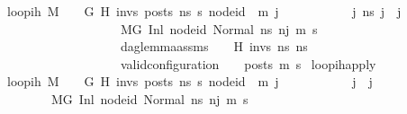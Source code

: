 \begin{isabellebody}
\ \ \ {\isachardoublequoteopen}loop{\isacharunderscore}{\kern0pt}ih\ M\ {\isasymLambda}\ {\isasymGamma}\ {\isasymOmega}\ G\ H\ invs\ posts\ ns{}\ s{\isacharprime}{\kern0pt}\ node{\isacharunderscore}{\kern0pt}id\ \ m{\isacharprime}{\kern0pt}\ j{\isasymequiv}\ \isanewline
\ \ \ \ \ \ \ \ \ \ {\isasymforall}j{\isacharprime}{\kern0pt}\ ns{}{\isacharprime}{\kern0pt}{\isacharprime}{\kern0pt}{\isachardot}{\kern0pt}\ j{\isacharprime}{\kern0pt}\ {\isasymle}\ j\ {\isasymlongrightarrow}\ \isanewline
\ \ \ \ \ \ \ \ \ \ \ \ \ \ \ \ \ \ \ \ \ {\isacharparenleft}{\kern0pt}M{\isacharcomma}{\kern0pt}{\isasymLambda}{\isacharcomma}{\kern0pt}{\isasymGamma}{\isacharcomma}{\kern0pt}{\isasymOmega}{\isacharcomma}{\kern0pt}G\ {\isasymturnstile}{\isacharparenleft}{\kern0pt}Inl\ node{\isacharunderscore}{\kern0pt}id{\isacharcomma}{\kern0pt}\ Normal\ ns{}{\isacharprime}{\kern0pt}{\isacharprime}{\kern0pt}{\isacharparenright}{\kern0pt}\ {\isacharminus}{\kern0pt}n{\isasymrightarrow}{\isacharcircum}{\kern0pt}j{\isacharprime}{\kern0pt}\ {\isacharparenleft}{\kern0pt}m{\isacharprime}{\kern0pt}{\isacharcomma}{\kern0pt}\ s{\isacharprime}{\kern0pt}{\isacharparenright}{\kern0pt}{\isacharparenright}{\kern0pt}\ {\isasymlongrightarrow}\isanewline
\ \ \ \ \ \ \ \ \ \ \ \ \ \ \ \ \ \ \ \ \ dag{\isacharunderscore}{\kern0pt}lemma{\isacharunderscore}{\kern0pt}assms\ {\isasymLambda}\ {\isasymGamma}\ {\isasymOmega}\ H\ invs\ ns{}{\isacharprime}{\kern0pt}{\isacharprime}{\kern0pt}\ ns{}\ {\isasymlongrightarrow}\ \isanewline
\ \ \ \ \ \ \ \ \ \ \ \ \ \ \ \ \ \ \ \ \ valid{\isacharunderscore}{\kern0pt}configuration\ {\isasymLambda}\ {\isasymGamma}\ {\isasymOmega}\ posts\ m{\isacharprime}{\kern0pt}\ s{\isacharprime}{\kern0pt}{\isachardoublequoteclose}\isanewline
\isanewline
{}\isamarkupfalse%
\ loop{\isacharunderscore}{\kern0pt}ih{\isacharunderscore}{\kern0pt}apply{\isacharcolon}{\kern0pt}\isanewline
\ \ \ {\isachardoublequoteopen}loop{\isacharunderscore}{\kern0pt}ih\ M\ {\isasymLambda}\ {\isasymGamma}\ {\isasymOmega}\ G\ H\ invs\ posts\ ns{}\ s{\isacharprime}{\kern0pt}\ node{\isacharunderscore}{\kern0pt}id\ \ m{\isacharprime}{\kern0pt}\ j{\isachardoublequoteclose}\ \isanewline
\ \ \ \ \ \ \ \ \ \ {\isachardoublequoteopen}j{\isacharprime}{\kern0pt}\ {\isasymle}\ j{\isachardoublequoteclose}\ \isanewline
\ \ \ \ \ \ \ \ \ \ {\isachardoublequoteopen}{\isacharparenleft}{\kern0pt}M{\isacharcomma}{\kern0pt}{\isasymLambda}{\isacharcomma}{\kern0pt}{\isasymGamma}{\isacharcomma}{\kern0pt}{\isasymOmega}{\isacharcomma}{\kern0pt}G\ {\isasymturnstile}{\isacharparenleft}{\kern0pt}Inl\ node{\isacharunderscore}{\kern0pt}id{\isacharcomma}{\kern0pt}\ Normal\ ns{}{\isacharprime}{\kern0pt}{\isacharprime}{\kern0pt}{\isacharparenright}{\kern0pt}\ {\isacharminus}{\kern0pt}n{\isasymrightarrow}{\isacharcircum}{\kern0pt}j{\isacharprime}{\kern0pt}\ {\isacharparenleft}{\kern0pt}m{\isacharprime}{\kern0pt}{\isacharcomma}{\kern0pt}\ s{\isacharprime}{\kern0pt}{\isacharparenright}{\kern0pt}{\isacharparenright}{\kern0pt}{\isachardoublequoteclose}\ \isanewline

\end{isabellebody}
